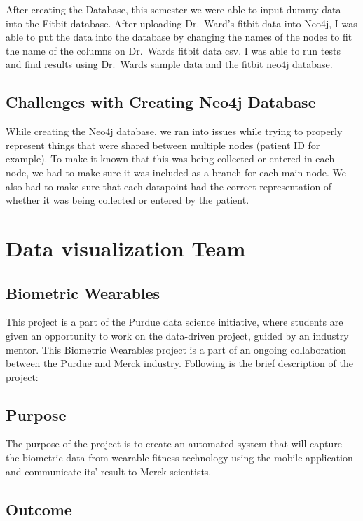 \documentclass[]{book}
\begin{document}
After creating the Database, this semester we were able to input dummy
data into the Fitbit database. After uploading Dr.~Ward's fitbit data
into Neo4j, I was able to put the data into the database by changing the
names of the nodes to fit the name of the columns on Dr.~Wards fitbit
data csv. I was able to run tests and find results using Dr.~Wards
sample data and the fitbit neo4j database.

\section{Challenges with Creating Neo4j
Database}\label{challenges-with-creating-neo4j-database}

While creating the Neo4j database, we ran into issues while trying to
properly represent things that were shared between multiple nodes
(patient ID for example). To make it known that this was being collected
or entered in each node, we had to make sure it was included as a branch
for each main node. We also had to make sure that each datapoint had the
correct representation of whether it was being collected or entered by
the patient.

\chapter{Data visualization Team}\label{data-visualization-team}

\section{Biometric Wearables}\label{biometric-wearables}

This project is a part of the Purdue data science initiative, where
students are given an opportunity to work on the data-driven project,
guided by an industry mentor. This Biometric Wearables project is a part
of an ongoing collaboration between the Purdue and Merck industry.
Following is the brief description of the project:

\section{Purpose}\label{purpose}

The purpose of the project is to create an automated system that will
capture the biometric data from wearable fitness technology using the
mobile application and communicate its' result to Merck scientists.

\section{Outcome}\label{outcome}
\end{document}
